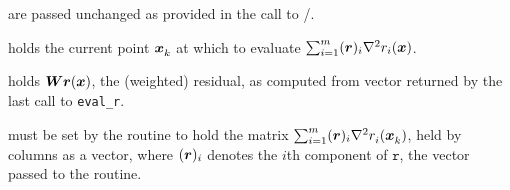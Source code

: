 

\begin{description}
   are passed unchanged as provided in the call to \mainroutine/\onestep.

   holds the current point ${\bm x}_{k}^{}$ at which to evaluate $\sum_{i=1}^m ({\bm r})_i \nabla^2 r_i({\bm x})$.

   holds ${\bm W}{\bm r}({\bm x})$, the (weighted) residual, as computed from vector returned by the last call to \texttt{eval\_r}.

   must be set by the routine to hold the matrix $\sum_{i = 1}^m ({\bm r})_{i}\nabla^2r_{i}^{}({\bm x}_{k}^{})$,
  held by columns as a vector, where $({\bm r})_i$ denotes the $i$th component of  $\texttt{r}$, the vector passed to the routine.

\end{description}
